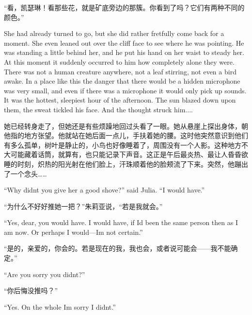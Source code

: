 \begin{paracol}{2}
\switchcolumn

``看，凯瑟琳！看那些花，就是矿底旁边的那簇。你看到了吗？它们有两种不同的颜色。''

\switchcolumn*

She had already turned to go, but she did rather fretfully come back for
a moment. She even leaned out over the cliff face to see where he was
pointing. He was standing a little behind her, and he put his hand on
her waist to steady her. At this moment it suddenly occurred to him how
completely alone they were. There was not a human creature anywhere, not
a leaf stirring, not even a bird awake. In a place like this the danger
that there would be a hidden microphone was very small, and even if
there was a microphone it would only pick up sounds. It was the hottest,
sleepiest hour of the afternoon. The sun blazed down upon them, the
sweat tickled his face. And the thought struck him....

\switchcolumn

她已经转身走了，但她还是有些烦躁地回过头看了一眼。她从悬崖上探出身体，朝他指的地方张望。他就站在她后面一点儿，手扶着她的腰。这时他突然意识到他们有多么孤单，树叶是静止的，小鸟也好像睡着了，周围没有一个人影。这种地方不大可能藏着话筒，就算有，也只能记录下声音。这正是午后最炎热、最让人昏昏欲睡的时刻，炽热的阳光射在他们脸上，汗珠顺着他的脸颊流了下来。突然，他蹦出了一个念头\ldots\ldots{}

\switchcolumn*

``Why didn\textquotesingle t you give her a good shove?'' said Julia. ``I
would have.''

\switchcolumn

``为什么不好好推她一把？''朱莉亚说，``若是我就会。''

\switchcolumn*

``Yes, dear, you would have. I would have, if I\textquotesingle d been
the same person then as I am now. Or perhaps I
would---I\textquotesingle m not certain.''

\switchcolumn

``是的，亲爱的，你会的。若是现在的我，我也会，或者说可能会——我不能确定。''

\switchcolumn*

``Are you sorry you didn\textquotesingle t?''

\switchcolumn

``你后悔没推吗？''

\switchcolumn*

``Yes. On the whole I\textquotesingle m sorry I didn\textquotesingle t.''


\end{paracol}

